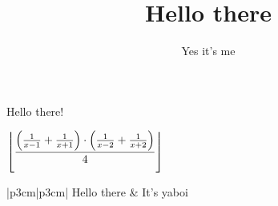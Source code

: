 \documentclass{article}
\title{Hello there}
\author{Yes it's me}
\date{}
\begin{document}
\maketitle

Hello there!

$\displaystyle\left\lfloor \frac{\left(\frac{1}{x-1} + \frac{1}{x+1}\right)\cdot\left(\frac{1}{x-2} + \frac{1}{x+2}\right)}{4}\right\rfloor$

\begin{mathtable}{|p{3cm}|p{3cm}|}
    \hline
    Hello there & It's yaboi \\
    \hline
\end{mathtable}
\end{document}
